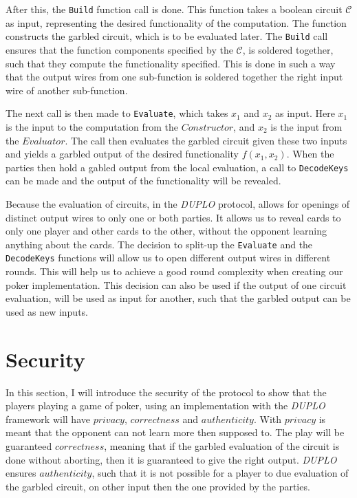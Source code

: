 \documentclass[twoside,11pt,openright]{report}
\newcommand{\DUPLO}{\textit{DUPLO} }
\begin{document}
After this, the \verb|Build| function call is done. This function takes a boolean circuit $\mathcal{C}$ as input, representing the desired functionality of the computation. The function constructs the garbled circuit, which is to be evaluated later. The \verb|Build| call ensures that the function components specified by the $\mathcal{C}$, is soldered together, such that they compute the functionality specified. This is done in such a way that the output wires from one sub-function is soldered together the right input wire of another sub-function. 

The next call is then made to \verb|Evaluate|, which takes $x_1$ and $x_2$ as input. Here $x_1$ is the input to the computation from the $Constructor$, and $x_2$ is the input from the $Evaluator$. The call then  evaluates the garbled circuit given these two inputs and yields a garbled output of the desired functionality $f(x_1,x_2)$. When the parties then hold a gabled output from the local evaluation, a call to \verb|DecodeKeys| can be made and the output of the functionality will be revealed.

\bigskip

Because the evaluation of circuits, in the \DUPLO protocol, allows for openings of distinct output wires to only one or both parties. It allows us to reveal cards to only one player and other cards to the other, without the opponent learning anything about the cards. The decision to split-up the \verb|Evaluate| and the \verb|DecodeKeys| functions will allow us to open different output wires in different rounds. This will help us to achieve a good round complexity when creating our poker implementation. This decision can also be used if the output of one circuit evaluation, will be used as input for another, such that the garbled output can be used as new inputs.


\section{Security}
\label{sec:duplo_secutity}
In this section, I will introduce the security of the protocol to show that the players playing a game of poker, using an implementation with the \DUPLO framework will have $privacy$, $correctness$ and $authenticity$. With $privacy$ is meant that the opponent can not learn more then supposed to. The play will be guaranteed $correctness$, meaning that if the garbled evaluation of the circuit is done without aborting, then it is guaranteed to give the right output. \DUPLO ensures $authenticity$, such that it is not possible for a player to due evaluation of the garbled circuit, on other input then the one provided by the parties.
\end{document}
